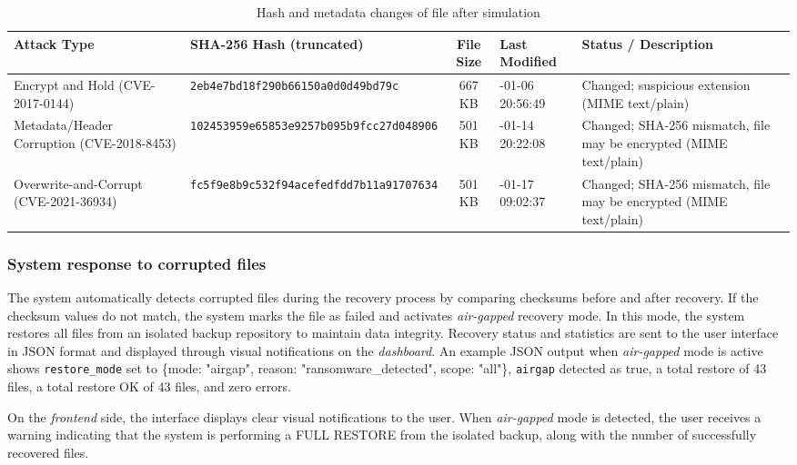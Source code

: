 \documentclass{iaesarticle}
\begin{document}
\begin{table}[H]
\centering
\fontsize{8pt}{10pt}\selectfont
\caption{Hash and metadata changes of file after simulation}
\label{tab:hash_after}
\begin{tabularx}{\textwidth}{@{}p{2.3cm} >{\raggedright\arraybackslash}X c >{\raggedright\arraybackslash}p{2.2cm} >{\raggedright\arraybackslash}X@{}}
\hline
\textbf{Attack Type} & \textbf{SHA-256 Hash (truncated)} & \textbf{File Size} & \textbf{Last Modified} & \textbf{Status / Description} \\
\hline
Encrypt and Hold (CVE-2017-0144) & \texttt{2eb4e7bd18f290\-b66150a0d0d49\-bd79c} & 667 KB & 2026-01-06 20:56:49 & Changed; suspicious extension (MIME text/plain) \\
Metadata/Header Corruption (CVE-2018-8453) & \texttt{102453959e6585\-3e9257b095b9\-fcc27d048906} & 501 KB & 2026-01-14 20:22:08 & Changed; SHA-256 mismatch, file may be encrypted (MIME text/plain) \\
Overwrite-and-Corrupt (CVE-2021-36934) & \texttt{fc5f9e8b9c532f\-94acefedfdd7\-b11a91707634} & 501 KB & 2026-01-17 09:02:37 & Changed; SHA-256 mismatch, file may be encrypted (MIME text/plain) \\
\hline
\end{tabularx}
\end{table}

\subsubsection{System response to corrupted files}
The system automatically detects corrupted files during the recovery process by comparing checksums before and after recovery. If the checksum values do not match, the system marks the file as failed and activates \textit{air-gapped} recovery mode. In this mode, the system restores all files from an isolated backup repository to maintain data integrity. Recovery status and statistics are sent to the user interface in JSON format and displayed through visual notifications on the \textit{dashboard}. An example JSON output when \textit{air-gapped} mode is active shows \texttt{restore\_mode} set to \{mode: "airgap", reason: "ransomware\_detected", scope: "all"\}, \texttt{airgap} detected as true, a total restore of 43 files, a total restore OK of 43 files, and zero errors.

On the \textit{frontend} side, the interface displays clear visual notifications to the user. When \textit{air-gapped} mode is detected, the user receives a warning indicating that the system is performing a FULL RESTORE from the isolated backup, along with the number of successfully recovered files.
\end{document}
